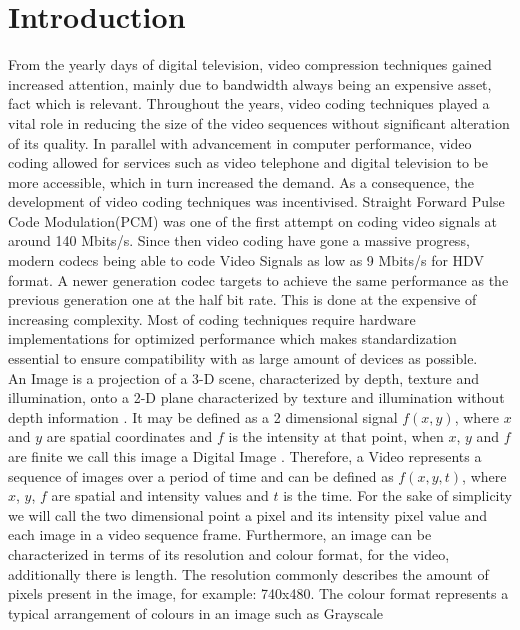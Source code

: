 \documentclass[a4paper,11pt,oneside]{article}
\begin{document}
\section{Introduction}
\indent From the yearly days of digital television, video compression techniques gained increased attention, mainly due to bandwidth always being
an expensive asset, fact which is relevant. Throughout the years, video coding techniques played a vital role in reducing the size of the video sequences without significant
alteration of its quality. In parallel with advancement in computer performance, video coding allowed for services such as video telephone and digital
television to be more accessible, which in turn increased the demand. As a consequence, the development of video coding techniques was incentivised.
Straight Forward Pulse Code Modulation(PCM) was one of the first attempt on coding video signals at around 140 Mbits/s. Since then video coding
have gone a massive progress, modern codecs being able to code Video Signals as low as 9 Mbits/s for HDV format. A newer generation codec targets
to achieve the same performance as the previous generation one at the half bit rate. This is done at the expensive of increasing complexity. Most of coding
techniques require hardware implementations for optimized performance which makes standardization essential to ensure compatibility with as large amount of devices
as possible.\cite{ghanbari2011standard}\\
\indent An Image is a projection of a 3-D scene, characterized by depth, texture and illumination, onto a 2-D plane characterized by texture and illumination
without depth information \cite[p.~5]{richardson2002video}. It may be defined as a 2 dimensional signal $ f(x, y) $, where $x$ and $y$ are spatial
coordinates and $f$ is the intensity at that point, when $x$, $y$ and $f$ are finite we call this image a Digital Image \cite[p.~1]{gonzalez2008digital}.
Therefore, a Video represents a sequence of images over a period of time and can be defined as $f(x,y,t)$, where $x$, $y$, $f$ are spatial and intensity values
and $t$ is the time.
For the sake of simplicity we will call the two dimensional point a pixel and its intensity pixel value and each image in a video sequence frame.
Furthermore, an image can be characterized in terms of its resolution and colour format, for the video, additionally there is length. The resolution
commonly describes the amount of pixels present in the image, for example: 740x480. The colour format represents a typical arrangement of colours in an image such as Grayscale
\end{document}
